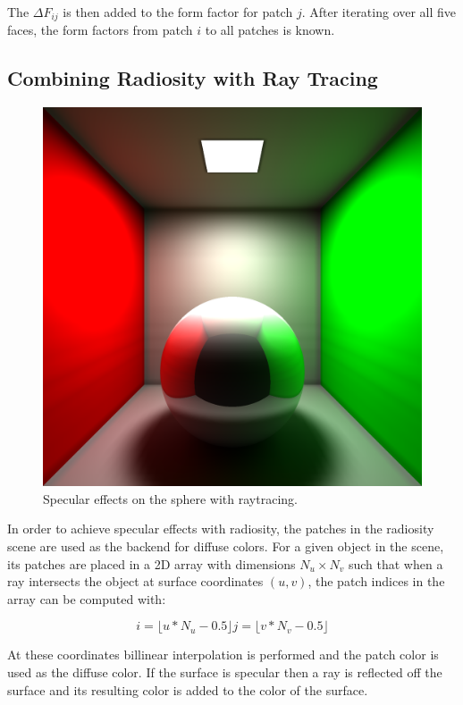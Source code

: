 \documentclass[sigconf]{acmart}
\begin{document}
The $\Delta F_{ij}$ is then added to the form factor for patch $j$. After iterating over all five faces, the form factors from patch $i$ to all patches is known.

\subsection{Combining Radiosity with Ray Tracing}

\begin{figure}[t]
    \includegraphics[width=\linewidth]{reportfiles/specular}
    \caption{Specular effects on the sphere with raytracing.}
    \label{fig:specular}
\end{figure}

In order to achieve specular effects with radiosity, the patches in the radiosity scene are used as the backend for diffuse colors. For a given object in the scene, its patches are placed in a 2D array with dimensions $N_u \times N_v$ such that when a ray intersects the object at surface coordinates $(u, v)$, the patch indices in the array can be computed with:

\[
    i = \lfloor u*N_u - 0.5 \rfloor
    j = \lfloor v*N_v - 0.5 \rfloor
\]

At these coordinates billinear interpolation is performed and the patch color is used as the diffuse color. If the surface is specular then a ray is reflected off the surface and its resulting color is added to the color of the surface.
\end{document}
